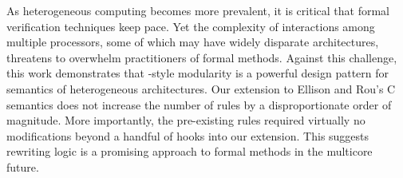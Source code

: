 As heterogeneous computing becomes more prevalent, it is critical that formal
verification techniques keep pace. Yet the complexity of interactions among
multiple processors, some of which may have widely disparate architectures,
threatens to overwhelm practitioners of formal methods. Against this challenge,
this work demonstrates that \K-style modularity is a powerful design pattern for
semantics of heterogeneous architectures. Our extension to Ellison and
Rou's C semantics does not increase the number of rules by a
disproportionate order of magnitude. More importantly, the pre-existing rules
required virtually no modifications beyond a handful of hooks into our
extension. This suggests rewriting logic is a promising approach to formal
methods in the multicore future.

